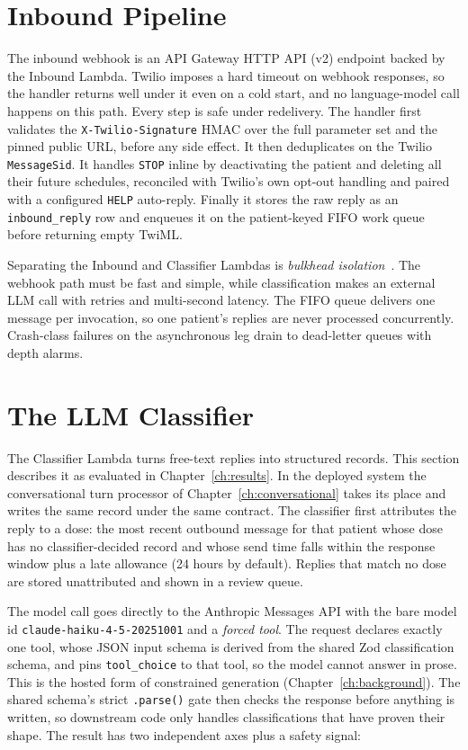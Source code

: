 \section{Inbound Pipeline}
\label{sec:arch-inbound}

The inbound webhook is an API Gateway HTTP API (v2) endpoint backed by the
Inbound Lambda. Twilio imposes a hard timeout on webhook responses, so the
handler returns well under it even on a cold start, and no language-model call
happens on this path. Every step is safe under
redelivery. The handler first validates the \texttt{X-Twilio-Signature}
HMAC over the full parameter set and the pinned public URL, before any side
effect. It then deduplicates on the Twilio \texttt{MessageSid}. It handles
\texttt{STOP} inline by deactivating the patient and deleting all their future
schedules, reconciled with Twilio's own opt-out handling and paired with a
configured \texttt{HELP} auto-reply. Finally it stores the raw reply as an
\texttt{inbound\_reply} row and enqueues it on the patient-keyed FIFO work
queue before returning empty TwiML.

Separating the Inbound and Classifier Lambdas is \emph{bulkhead
isolation}~\cite{nygard2018releaseit}. The webhook path must be fast and
simple, while classification makes an external LLM call with retries and
multi-second latency. The FIFO queue delivers one message per invocation, so
one patient's replies are never processed concurrently. Crash-class failures on
the asynchronous leg drain to dead-letter queues with depth alarms.

\section{The LLM Classifier}
\label{sec:arch-classifier}

The Classifier Lambda turns free-text replies into structured records. This
section describes it as evaluated in Chapter~\ref{ch:results}. In the deployed
system the conversational turn processor of Chapter~\ref{ch:conversational}
takes its place and writes the same record under the same contract. The
classifier first attributes the reply to a dose: the most recent outbound
message for that patient whose dose has no classifier-decided record and whose
send time falls within the response window plus a late allowance (24 hours by
default). Replies that match no dose are stored unattributed and shown in a
review queue.

The model call goes directly to the Anthropic Messages API with the bare model
id \texttt{claude-haiku-4-5-20251001} and a \emph{forced tool}. The request
declares exactly one tool, whose JSON input schema is derived from the shared
Zod classification schema, and pins \texttt{tool\_choice} to that tool, so the
model cannot answer in prose. This is the hosted form of constrained generation (Chapter~\ref{ch:background}). The shared schema's strict
\texttt{.parse()} gate then checks the response before anything is written, so
downstream code only handles classifications that have proven their shape. The
result has two independent axes plus a safety signal:

